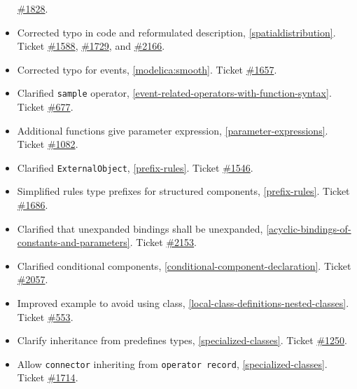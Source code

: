 \begin{itemize}
  \href{https://github.com/modelica/ModelicaSpecification/issues/1828}{\#1828}.
\item
  Corrected typo in code and reformulated description, \cref{spatialdistribution}.
  Ticket \href{https://github.com/modelica/ModelicaSpecification/issues/1588}{\#1588},
  \href{https://github.com/modelica/ModelicaSpecification/issues/1729}{\#1729}, and
  \href{https://github.com/modelica/ModelicaSpecification/issues/2166}{\#2166}.
\item
  Corrected typo for events, \cref{modelica:smooth}. Ticket
  \href{https://github.com/modelica/ModelicaSpecification/issues/1657}{\#1657}.
\item
  Clarified \lstinline!sample! operator, \cref{event-related-operators-with-function-syntax}.
  Ticket \href{https://github.com/modelica/ModelicaSpecification/issues/677}{\#677}.
\item
  Additional functions give parameter expression, \cref{parameter-expressions}. Ticket
  \href{https://github.com/modelica/ModelicaSpecification/issues/1082}{\#1082}.
\item
  Clarified \lstinline!ExternalObject!, \cref{prefix-rules}.
  Ticket \href{https://github.com/modelica/ModelicaSpecification/issues/1546}{\#1546}.
\item
  Simplified rules type prefixes for structured components, \cref{prefix-rules}. Ticket
  \href{https://github.com/modelica/ModelicaSpecification/issues/1686}{\#1686}.
\item
  Clarified that unexpanded bindings shall be unexpanded, \cref{acyclic-bindings-of-constants-and-parameters}.
  Ticket \href{https://github.com/modelica/ModelicaSpecification/issues/2153}{\#2153}.
\item
  Clarified conditional components, \cref{conditional-component-declaration}. Ticket
  \href{https://github.com/modelica/ModelicaSpecification/issues/2057}{\#2057}.
\item
  Improved example to avoid using class, \cref{local-class-definitions-nested-classes}. Ticket
  \href{https://github.com/modelica/ModelicaSpecification/issues/553}{\#553}.
\item
  Clarify inheritance from predefines types, \cref{specialized-classes}. Ticket
  \href{https://github.com/modelica/ModelicaSpecification/issues/1250}{\#1250}.
\item
  Allow \lstinline!connector! inheriting from \lstinline!operator record!, \cref{specialized-classes}.
  Ticket \href{https://github.com/modelica/ModelicaSpecification/issues/1714}{\#1714}.

\end{itemize}
